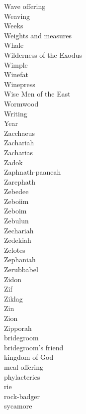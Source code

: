 Wave offering  \\
Weaving  \\
Weeks  \\
Weights and measures  \\
Whale  \\
Wilderness of the Exodus  \\
Wimple  \\
Winefat  \\
Winepress  \\
Wise Men of the East  \\
Wormwood  \\
Writing  \\
Year  \\
Zacchaeus  \\
Zachariah  \\
Zacharias  \\
Zadok  \\
Zaphnath-paaneah  \\
Zarephath  \\
Zebedee  \\
Zeboiim  \\
Zeboim  \\
Zebulun  \\
Zechariah  \\
Zedekiah  \\
Zelotes  \\
Zephaniah  \\
Zerubbabel  \\
Zidon  \\
Zif  \\
Ziklag  \\
Zin  \\
Zion  \\
Zipporah  \\
bridegroom  \\
bridegroom’s friend  \\
kingdom of God  \\
meal offering  \\
phylacteries  \\
rie  \\
rock-badger  \\
sycamore  \\
